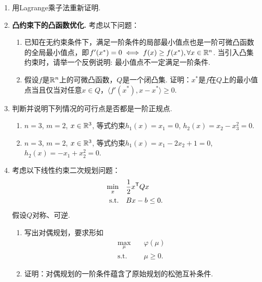 \begin{enumerate}[wide, labelindent=0pt]
    \item 用Lagrange乘子法重新证明.
    \item \textbf{凸约束下的凸函数优化.} 考虑以下问题：
    \begin{enumerate}
        \item 已知在无约束条件下，满足一阶条件的局部最小值点也是一阶可微凸函数的全局最小值点，即$f'(x^*)=0\iff f(x)\ge f(x^*), \forall x\in \mathbb{R}^n$. 当引入凸集约束时，请举一个反例说明: 最小值点不一定满足一阶条件.
        \item 假设$f$是$\mathbb{R}^n$上的可微凸函数，$Q$是一个闭凸集. 证明：$x^*$是$f$在$Q$上的最小值点当且仅当对任意$x\in Q$，$\langle f'(x^*),x-x^*\rangle\geq 0$.
    \end{enumerate}

    \item 判断并说明下列情况的可行点是否都是一阶正规点.
    \begin{enumerate}
    \item $n=3$, $m=2$, $x\in\mathbb{R}^3$, 等式约束$h_1(x) = x_1=0$, $h_2(x)=x_2-x_3^2=0$.
    \item $n=3$, $m=2$, $x\in \mathbb{R}^3$, 等式约束$h_1(x)=x_1-2x_2+1=0$, $h_2(x)=-x_1+x_2^2=0$.
    \end{enumerate}

    \item 考虑以下线性约束二次规划问题：
    \begin{align*}
    \min_x \quad&  \frac{1}{2}x^{\mathsf{T}} Qx\\
    \text{s.t.}\quad& Bx-b\le 0. 
    \end{align*}
    假设$Q$对称、可逆.
    \begin{enumerate}
        \item 写出对偶规划，要求形如
        \begin{align*}
        \max_\mu \quad&  \varphi(\mu)\\
        \text{s.t.}\quad& \mu\geq 0. 
        \end{align*}
        \item 证明：对偶规划的一阶条件蕴含了原始规划的松弛互补条件.
    \end{enumerate}


\end{enumerate}
